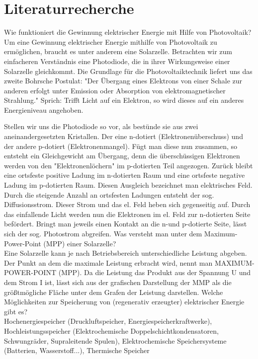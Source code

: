 \section{Literaturrecherche}
Wie funktioniert die Gewinnung elektrischer Energie mit Hilfe von Photovoltaik?\\
Um eine Gewinnung elektrischer Energie mithilfe von Photovoltaik zu ermöglichen, braucht es unter anderem eine Solarzelle. Betrachten wir zum einfacheren Verständnis eine Photodiode, die in ihrer Wirkungsweise einer Solarzelle gleichkommt. 
Die Grundlage für die Photovoltaiktechnik liefert uns das zweite Bohrsche Postulat: "Der Übergang eines Elektrons von einer Schale zur anderen erfolgt unter Emission oder Absorption von elektromagnetischer Strahlung." Sprich: Trifft Licht auf ein Elektron, so wird dieses auf ein anderes Energieniveau angehoben. 

Stellen wir uns die Photodiode so vor, als bestünde sie aus zwei aneinandergesetzten Kristallen. Der eine n-dotiert (Elektronenüberschuss) und der andere p-dotiert (Elektronenmangel). Fügt man diese nun zusammen, so entsteht ein Gleichgewicht am Übergang, denn die überschüssigen Elektronen werden von den "Elektronenlöchern" im p-dotierten Teil angezogen. Zurück bleibt eine ortsfeste positive Ladung im n-dotierten Raum und eine ortsfeste negative Ladung im p-dotierten Raum. Diesen Ausgleich bezeichnet man elektrisches Feld. Durch die steigende Anzahl an ortsfesten Ladungen entsteht der sog. Diffusionsstrom. Dieser Strom und das el. Feld heben sich gegenseitig auf.
Durch das einfallende Licht werden nun die Elektronen im el. Feld zur n-dotierten Seite befördert. Bringt man jeweils einen Kontakt an die n-und p-dotierte Seite, lässt sich der sog. Photostrom abgreifen. 
Was versteht man unter dem Maximum-Power-Point (MPP) einer Solarzelle?\\
Eine Solarzelle kann je nach Betriebsbereich unterschiedliche Leistung abgeben. Der Punkt an dem die maximale Leistung erbracht wird, nennt man MAXIMUM-POWER-POINT (MPP). Da die Leistung das Produkt aus der Spannung U und dem Strom I ist, lässt sich aus der grafischen Darstellung der MMP als die größtmögliche Fläche unter dem Grafen der Leistung darstellen.
Welche Möglichkeiten zur Speicherung von (regenerativ erzeugter) elektrischer Energie
gibt es?\\
Hochenergiespeicher (Druckluftspeicher, Energiespeicherkraftwerke), Hochleistungsspeicher (Elektrochemische Doppelschichtkondensatoren, Schwungräder, Supraleitende Spulen), Elektrochemische Speichersysteme (Batterien, Wasserstoff...), Thermische Speicher\\

